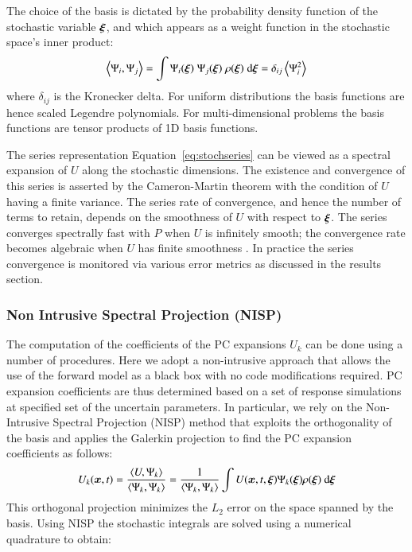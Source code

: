 The choice of the basis is dictated by the probability density
function of the stochastic variable $\xxi$, and which appears as a weight
function in the stochastic space's inner product:
\begin{equation}
 \left<\Psi_i,\Psi_j\right> = \int \Psi_i(\xxi) \;\Psi_j(\xxi) \; \rho(\xxi) \; \mbox{d}\xxi=\delta_{ij}\ave{\Psi_i^2}
\label{eq:inner}
\end{equation}
where $\delta_{ij}$ is the Kronecker delta.
For uniform
distributions the basis functions are hence scaled Legendre polynomials.
For multi-dimensional problems the basis functions are
tensor products of 1D basis functions.

The series representation Equation~\ref{eq:stochseries} can be viewed as a spectral expansion
of $U$ along the stochastic dimensions. The existence and convergence of this series
is asserted by the Cameron-Martin theorem \citep{Cameron:1947} with the condition of $U$ having a finite variance.
The series rate of convergence, and hence the number of terms to retain, depends on the smoothness of
$U$ with respect to $\xxi$. The series converges spectrally fast with $P$
when $U$ is infinitely smooth; the convergence rate becomes algebraic
when $U$ has finite smoothness \citep{Canuto:2006}. In practice the series convergence is monitored 
via various error metrics as discussed in the results section.

\subsubsection{Non Intrusive Spectral Projection (NISP)}
The computation of the coefficients of the PC expansions $U_k$
can be done using a number of procedures. Here we adopt a non-intrusive
approach that allows the use of the forward model \geoclaw as a black box
with no code modifications required. PC expansion coefficients are thus determined
based on a set of response \geoclaw simulations at specified set of the uncertain parameters. 
In particular, we rely on the Non-Intrusive Spectral Projection (NISP) method that exploits the orthogonality of the basis and applies the Galerkin projection to find the PC expansion coefficients as follows:
\begin{equation}
 U_k(\bm{x},t) = \frac{\left< U, \Psi_k \right>}{\left< \Psi_k, \Psi_k \right>} = 
 \frac{1}{\left< \Psi_k, \Psi_k \right>} 
 \int U(\bm{x},t,\xxi) \Psi_k(\xxi) \rho(\xxi) \mbox{ d}\xxi
\end{equation}
This orthogonal projection minimizes the $L_2$ error on the space spanned by the basis.
Using NISP the stochastic integrals are solved using a numerical quadrature to obtain:

